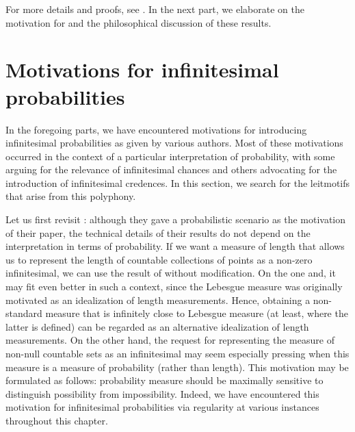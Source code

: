 For more details and proofs, see \citet{Benci_etal:2013}. In the next part, we elaborate on the motivation for and the philosophical discussion of these results.

{}\label{part:phil}
\section{Motivations for infinitesimal probabilities}
In the foregoing parts, we have encountered motivations for introducing infinitesimal probabilities as given by various authors. Most of these motivations occurred in the context of a particular interpretation of probability, with some arguing for the relevance of infinitesimal chances and others advocating for the introduction of infinitesimal credences. In this section, we search for the leitmotifs that arise from this polyphony.

Let us first revisit \citet{BernsteinWattenberg:1969}: although they gave a probabilistic scenario as the motivation of their paper, the technical details of their results do not depend on the interpretation in terms of probability. If we want a measure of length that allows us to represent the length of countable collections of points as a non-zero infinitesimal, we can use the result of \citet{BernsteinWattenberg:1969} without modification. On the one and, it may fit even better in such a context, since the Lebesgue measure was originally motivated as an idealization of length measurements. Hence, obtaining a non-standard measure that is infinitely close to Lebesgue measure (at least, where the latter is defined) can be regarded as an alternative idealization of length measurements.
On the other hand, the request for representing the measure of non-null countable sets as an infinitesimal may seem especially pressing when this measure is a measure of probability (rather than length).
This motivation may be formulated as follows: probability measure should be maximally sensitive to distinguish possibility from impossibility.
Indeed, we have encountered this motivation for infinitesimal probabilities via regularity at various instances throughout this chapter.

